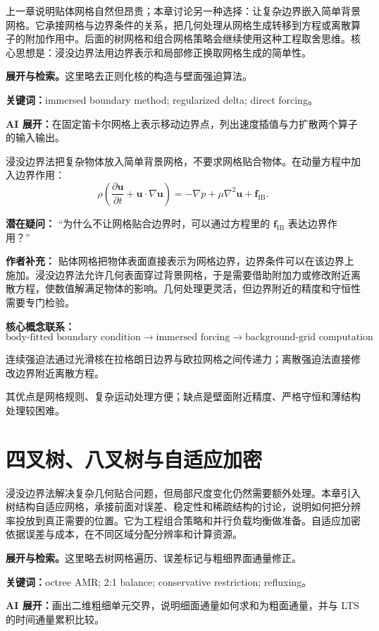 \documentclass[11pt,openany]{ctexbook}
\newcommand{\studyroute}[3]{%
  \par\smallskip\noindent\textbf{展开与检索。}#1\par
  \noindent\textbf{关键词：}#2。\par
  \noindent\textbf{AI 展开：}#3\par
}
\begin{document}
\begin{chaptersummary}
上一章说明贴体网格自然但昂贵；本章讨论另一种选择：让复杂边界嵌入简单背景网格。它承接网格与边界条件的关系，把几何处理从网格生成转移到方程或离散算子的附加作用中。后面的树网格和组合网格策略会继续使用这种工程取舍思维。核心思想是：浸没边界法用边界表示和局部修正换取网格生成的简单性。
\end{chaptersummary}
\studyroute{这里略去正则化核的构造与壁面强迫算法。}{immersed boundary method; regularized delta; direct forcing}{在固定笛卡尔网格上表示移动边界点，列出速度插值与力扩散两个算子的输入输出。}

浸没边界法把复杂物体放入简单背景网格，不要求网格贴合物体。在动量方程中加入边界作用：
\[
\rho\left(
\frac{\partial\bm u}{\partial t}
+\bm u\cdot\nabla\bm u
\right)
=
-\nabla p+\mu\nabla^2\bm u+\bm f_{\mathrm{IB}}.
\]

\begin{authornote}
\textbf{潜在疑问：}
“为什么不让网格贴合边界时，可以通过方程里的 \(\bm f_{\mathrm{IB}}\) 表达边界作用？”

\textbf{作者补充：}
贴体网格把物体表面直接表示为网格边界，边界条件可以在该边界上施加。浸没边界法允许几何表面穿过背景网格，于是需要借助附加力或修改附近离散方程，使数值解满足物体的影响。几何处理更灵活，但边界附近的精度和守恒性需要专门检验。

\textbf{核心概念联系：}
\[
\text{body-fitted boundary condition}
\longrightarrow
\text{immersed forcing}
\longrightarrow
\text{background-grid computation}
\]
\end{authornote}

连续强迫法通过光滑核在拉格朗日边界与欧拉网格之间传递力；离散强迫法直接修改边界附近离散方程。

其优点是网格规则、复杂运动处理方便；缺点是壁面附近精度、严格守恒和薄结构处理较困难。

\chapter{四叉树、八叉树与自适应加密}

\begin{chaptersummary}
浸没边界法解决复杂几何贴合问题，但局部尺度变化仍然需要额外处理。本章引入树结构自适应网格，承接前面对误差、稳定性和稀疏结构的讨论，说明如何把分辨率投放到真正需要的位置。它为工程组合策略和并行负载均衡做准备。自适应加密依据误差与成本，在不同区域分配分辨率和计算资源。
\end{chaptersummary}
\studyroute{这里略去树网格遍历、误差标记与粗细界面通量修正。}{octree AMR; 2:1 balance; conservative restriction; refluxing}{画出二维粗细单元交界，说明细面通量如何求和为粗面通量，并与 LTS 的时间通量累积比较。}
\end{document}
